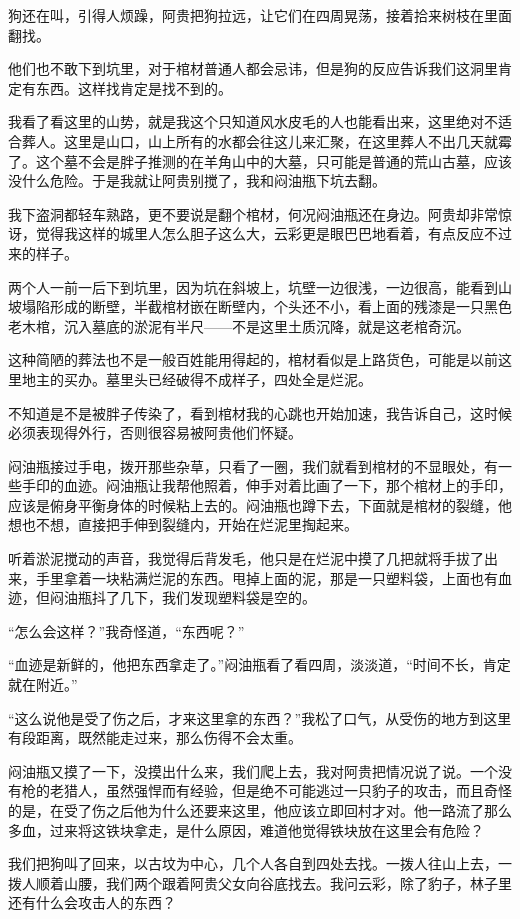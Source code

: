 狗还在叫，引得人烦躁，阿贵把狗拉远，让它们在四周晃荡，接着拾来树枝在里面翻找。

他们也不敢下到坑里，对于棺材普通人都会忌讳，但是狗的反应告诉我们这洞里肯定有东西。这样找肯定是找不到的。

我看了看这里的山势，就是我这个只知道风水皮毛的人也能看出来，这里绝对不适合葬人。这里是山口，山上所有的水都会往这儿来汇聚，在这里葬人不出几天就霉了。这个墓不会是胖子推测的在羊角山中的大墓，只可能是普通的荒山古墓，应该没什么危险。于是我就让阿贵别搅了，我和闷油瓶下坑去翻。

我下盗洞都轻车熟路，更不要说是翻个棺材，何况闷油瓶还在身边。阿贵却非常惊讶，觉得我这样的城里人怎么胆子这么大，云彩更是眼巴巴地看着，有点反应不过来的样子。

两个人一前一后下到坑里，因为坑在斜坡上，坑壁一边很浅，一边很高，能看到山坡塌陷形成的断壁，半截棺材嵌在断壁内，个头还不小，看上面的残漆是一只黑色老木棺，沉入墓底的淤泥有半尺——不是这里土质沉降，就是这老棺奇沉。

这种简陋的葬法也不是一般百姓能用得起的，棺材看似是上路货色，可能是以前这里地主的买办。墓里头已经破得不成样子，四处全是烂泥。

不知道是不是被胖子传染了，看到棺材我的心跳也开始加速，我告诉自己，这时候必须表现得外行，否则很容易被阿贵他们怀疑。

闷油瓶接过手电，拨开那些杂草，只看了一圈，我们就看到棺材的不显眼处，有一些手印的血迹。闷油瓶让我帮他照着，伸手对着比画了一下，那个棺材上的手印，应该是俯身平衡身体的时候粘上去的。闷油瓶也蹲下去，下面就是棺材的裂缝，他想也不想，直接把手伸到裂缝内，开始在烂泥里掏起来。

听着淤泥搅动的声音，我觉得后背发毛，他只是在烂泥中摸了几把就将手拔了出来，手里拿着一块粘满烂泥的东西。甩掉上面的泥，那是一只塑料袋，上面也有血迹，但闷油瓶抖了几下，我们发现塑料袋是空的。

“怎么会这样？”我奇怪道，“东西呢？”

“血迹是新鲜的，他把东西拿走了。”闷油瓶看了看四周，淡淡道，“时间不长，肯定就在附近。”

“这么说他是受了伤之后，才来这里拿的东西？”我松了口气，从受伤的地方到这里有段距离，既然能走过来，那么伤得不会太重。

闷油瓶又摸了一下，没摸出什么来，我们爬上去，我对阿贵把情况说了说。一个没有枪的老猎人，虽然强悍而有经验，但是绝不可能逃过一只豹子的攻击，而且奇怪的是，在受了伤之后他为什么还要来这里，他应该立即回村才对。他一路流了那么多血，过来将这铁块拿走，是什么原因，难道他觉得铁块放在这里会有危险？

我们把狗叫了回来，以古坟为中心，几个人各自到四处去找。一拨人往山上去，一拨人顺着山腰，我们两个跟着阿贵父女向谷底找去。我问云彩，除了豹子，林子里还有什么会攻击人的东西？

